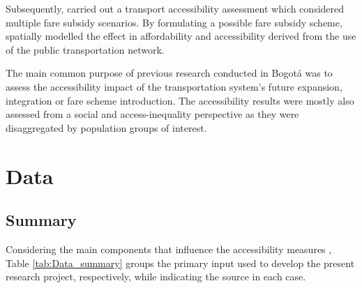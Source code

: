 \documentclass[12pt, a4paper]{report}
\begin{document}
Subsequently, \cite{guzmanAccessibilityAffordabilityEquity2018} carried out a transport accessibility assessment which considered multiple fare subsidy scenarios. By formulating a possible fare subsidy scheme, \cite{guzmanAccessibilityAffordabilityEquity2018} spatially modelled the effect in affordability and accessibility derived from the use of the public transportation network.

The main common purpose of previous research conducted in Bogotá was to assess the accessibility impact of the transportation system's future expansion, integration or fare scheme introduction. The accessibility results were mostly also assessed from a social and access-inequality perspective as they were disaggregated by population groups of interest.



\chapter{Data} \label{Chap3}


\section{Summary}

Considering the main components that influence the accessibility measures \citep{pereiraIntroductionUrbanAccessibility2023a}, Table \ref{tab:Data_summary} groups the primary input used to develop the present research project, respectively, while indicating the source in each case.
\end{document}

